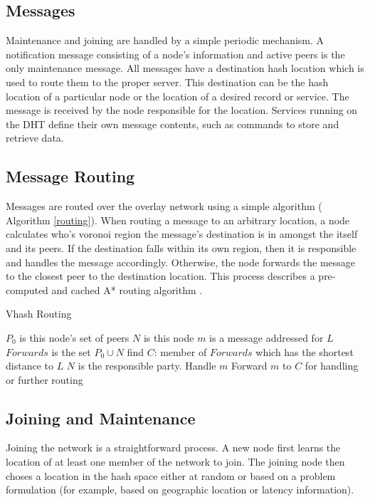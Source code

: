 \documentclass[11pt]{IEEEtran} %
\begin{document}
\subsection{Messages}
Maintenance and joining are handled by a simple periodic mechanism. A notification message consisting of a node's information and active peers is the only maintenance message. All messages have a destination hash location which is used to route them to the proper server. This destination can be the hash location of a particular node or the location of a desired record or service.  The message is received by the node responsible for the location. Services running on the DHT define their own message contents, such as commands to store and retrieve data.

\subsection{Message Routing}
Messages are routed over the overlay network using a simple algorithm ( Algorithm \ref{routing}). 
When routing a message to an arbitrary location, a node calculates who's voronoi region the message's destination is in amongst the itself and its peers. If the destination falls within its own region, then it is responsible and handles the message accordingly. Otherwise, the node forwards the message to the closest peer to the destination location. This process describes a pre-computed and cached A* routing  algorithm \cite{astar} . 

\begin{algorithm}
\caption{Vhash Routing}
\label{routing}
\begin{algorithmic}[1]  %
	\STATE $P_0$ is this node's set of peers
    \STATE $N$ is this node
	\STATE $m$ is a message addressed for $L$
    \STATE $Forwards$ is the set $P_0\cup{}N$
    \STATE find $C$: member of $Forwards$ which has the shortest distance to $L$
    	\STATE $N$ is the responsible party.
        \STATE Handle $m$
    \ELSE
    	\STATE Forward $m$ to $C$ for handling or further routing
    \ENDIF
\end{algorithmic}
\end{algorithm}

\subsection{Joining and Maintenance}
Joining the network is a straightforward process. A new node first learns the location of at least one member of the network to join. The joining node then choses a location in the hash space either at random or based on a problem formulation (for example, based on geographic location or latency information).
\end{document}
